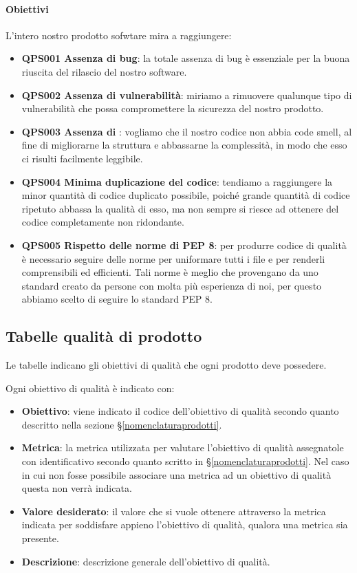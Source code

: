 		\paragraph*{Obiettivi} 	
		L'intero nostro prodotto sofwtare mira a raggiungere:
		\begin{itemize}
			\item \textbf{QPS001 Assenza di bug}: la totale assenza di bug è essenziale per la buona riuscita del rilascio del nostro software.
			\item \textbf{QPS002 Assenza di vulnerabilità}: miriamo a rimuovere qualunque tipo di vulnerabilità che possa compromettere la sicurezza del nostro prodotto.
			\item \textbf{QPS003 Assenza di }: vogliamo che il nostro codice non abbia code smell, al fine di migliorarne la struttura e abbassarne la complessità, in modo che esso ci risulti facilmente leggibile.
			\item \textbf{QPS004 Minima duplicazione del codice}: tendiamo a raggiungere la minor quantità di codice duplicato possibile, poiché grande quantità di codice ripetuto abbassa la qualità di esso, ma non sempre si riesce ad ottenere del codice completamente non ridondante.
            \item \textbf{QPS005 Rispetto delle norme di PEP 8}: per produrre codice di qualità è necessario seguire delle norme per uniformare tutti i file e per renderli comprensibili ed efficienti. Tali norme è meglio che provengano da uno standard creato da persone con molta più esperienza di noi, per questo abbiamo scelto di seguire lo standard PEP 8. 
		\end{itemize}


\subsection{Tabelle qualità di prodotto} \label{tabellequalitaprodotto}
Le tabelle indicano gli obiettivi di qualità che ogni prodotto deve possedere.

Ogni obiettivo di qualità è indicato con:

\begin{itemize}
	\item \textbf{Obiettivo}: viene indicato il codice dell'obiettivo di qualità secondo quanto descritto nella sezione \S\ref{nomenclaturaprodotti}.
	\item \textbf{Metrica}: la metrica utilizzata per valutare l'obiettivo di qualità assegnatole con identificativo secondo quanto scritto in \S\ref{nomenclaturaprodotti}. Nel caso in cui non fosse possibile associare una metrica ad un obiettivo di qualità questa non verrà indicata.
	\item \textbf{Valore desiderato}: il valore che si vuole ottenere attraverso la metrica indicata per soddisfare appieno l'obiettivo di qualità, qualora una metrica sia presente.
	\item \textbf{Descrizione}: descrizione generale dell'obiettivo di qualità.
\end{itemize}



